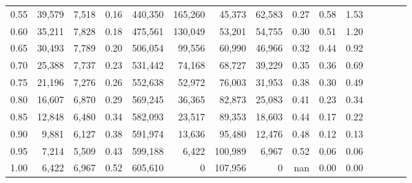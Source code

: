 \begin{tabular}{rrrcrrrrrrrrrrr}
0.55 &  39,579 &  7,518 &                                       0.16 &  440,350 &  165,260 &   45,373 &   62,583 &  0.27 &  0.58 &                         1.53 \\
0.60 &  35,211 &  7,828 &                                       0.18 &  475,561 &  130,049 &   53,201 &   54,755 &  0.30 &  0.51 &                         1.20 \\
0.65 &  30,493 &  7,789 &                                       0.20 &  506,054 &   99,556 &   60,990 &   46,966 &  0.32 &  0.44 &                         0.92 \\
0.70 &  25,388 &  7,737 &                                       0.23 &  531,442 &   74,168 &   68,727 &   39,229 &  0.35 &  0.36 &                         0.69 \\
0.75 &  21,196 &  7,276 &                                       0.26 &  552,638 &   52,972 &   76,003 &   31,953 &  0.38 &  0.30 &                         0.49 \\
0.80 &  16,607 &  6,870 &                                       0.29 &  569,245 &   36,365 &   82,873 &   25,083 &  0.41 &  0.23 &                         0.34 \\
0.85 &  12,848 &  6,480 &                                       0.34 &  582,093 &   23,517 &   89,353 &   18,603 &  0.44 &  0.17 &                         0.22 \\
0.90 &   9,881 &  6,127 &                                       0.38 &  591,974 &   13,636 &   95,480 &   12,476 &  0.48 &  0.12 &                         0.13 \\
0.95 &   7,214 &  5,509 &                                       0.43 &  599,188 &    6,422 &  100,989 &    6,967 &  0.52 &  0.06 &                         0.06 \\
1.00 &   6,422 &  6,967 &                                       0.52 &  605,610 &        0 &  107,956 &        0 &   nan &  0.00 &                         0.00 \\
\bottomrule
\end{tabular}
